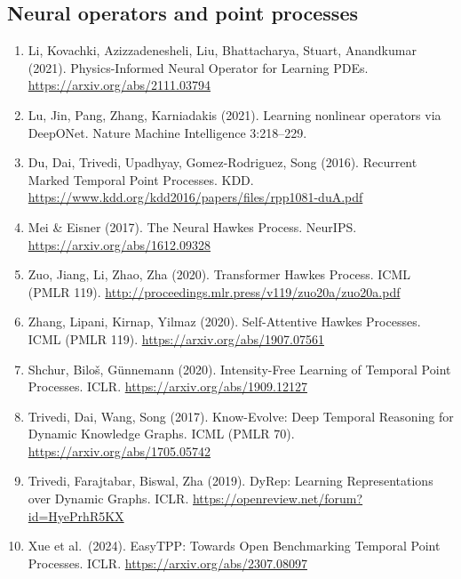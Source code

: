\documentclass[11pt]{article}
\begin{document}
\subsection*{Neural operators and point processes}
\begin{enumerate}[leftmargin=1.6em,itemsep=2pt,start=6]
\item Li, Kovachki, Azizzadenesheli, Liu, Bhattacharya, Stuart, Anandkumar (2021).
Physics-Informed Neural Operator for Learning PDEs. \url{https://arxiv.org/abs/2111.03794}
\item Lu, Jin, Pang, Zhang, Karniadakis (2021). Learning nonlinear operators via DeepONet.
Nature Machine Intelligence 3:218--229.
\item Du, Dai, Trivedi, Upadhyay, Gomez-Rodriguez, Song (2016). Recurrent Marked Temporal
Point Processes. KDD. \url{https://www.kdd.org/kdd2016/papers/files/rpp1081-duA.pdf}
\item Mei \& Eisner (2017). The Neural Hawkes Process. NeurIPS. \url{https://arxiv.org/abs/1612.09328}
\item Zuo, Jiang, Li, Zhao, Zha (2020). Transformer Hawkes Process. ICML (PMLR 119).
\url{http://proceedings.mlr.press/v119/zuo20a/zuo20a.pdf}
\item Zhang, Lipani, Kirnap, Yilmaz (2020). Self-Attentive Hawkes Processes. ICML (PMLR 119).
\url{https://arxiv.org/abs/1907.07561}
\item Shchur, Bilo\v{s}, G\"unnemann (2020). Intensity-Free Learning of Temporal Point
Processes. ICLR. \url{https://arxiv.org/abs/1909.12127}
\item Trivedi, Dai, Wang, Song (2017). Know-Evolve: Deep Temporal Reasoning for Dynamic
Knowledge Graphs. ICML (PMLR 70). \url{https://arxiv.org/abs/1705.05742}
\item Trivedi, Farajtabar, Biswal, Zha (2019). DyRep: Learning Representations over
Dynamic Graphs. ICLR. \url{https://openreview.net/forum?id=HyePrhR5KX}
\item Xue et al.\ (2024). EasyTPP: Towards Open Benchmarking Temporal Point Processes.
ICLR. \url{https://arxiv.org/abs/2307.08097}
\end{enumerate}
\end{document}
